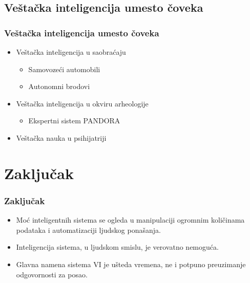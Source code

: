 \documentclass{beamer}
\begin{document}
\subsection{Veštačka inteligencija umesto čoveka}
\begin{frame}[fragile]\frametitle{Veštačka inteligencija umesto čoveka}
\begin{itemize}
    \item Veštačka inteligencija u saobraćaju
    \begin{itemize}
        \item Samovozeći automobili
        \item Autonomni brodovi
    \end{itemize}
    \item Veštačka inteligencija u okviru arheologije
    \begin{itemize}
        \item Ekspertni sistem PANDORA
    \end{itemize}
    \item Veštačka nauka u psihijatriji
    
\end{itemize}

\section{Zaključak}

\begin{frame}[fragile]\frametitle{Zaključak}
        \begin{itemize}
            \item Moć inteligentnih sistema se ogleda u manipulaciji ogromnim količinama podataka i automatizaciji ljudskog ponašanja.
        \item Inteligencija sistema, u ljudskom smislu, je verovatno nemoguća.
        \item Glavna namena sistema VI je ušteda vremena, ne i potpuno preuzimanje odgovornosti za posao.
        \end{itemize}
\end{frame}

\end{frame}
\end{document}
